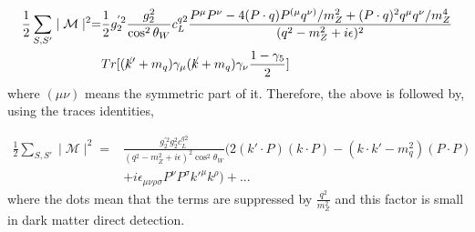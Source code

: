 \documentclass[12pt]{article}
\begin{document}
\begin{equation}
\begin{aligned}
\frac{1}{2}\sum_{S,S'} \mid \mathcal M \mid ^2 = 
&
\frac{1}{2} g_2 ^{'2} \frac{g_2^2}{\cos^2 \theta_W} c^{q2}_L \frac{P^\mu P^\nu - 4(P \cdot q ) P^{(\mu} q^{\nu)} / m_Z^2 + (P \cdot q )^2 q^\mu q^\nu / m_Z^4 }{(q^2-m_Z^2 +i\epsilon)^2} \\
 &  Tr[(\cancel k'+m_q)  \gamma_\mu (\cancel k+m_q) \gamma_\nu \frac{1-\gamma_5}{2}]
\end{aligned}
\end{equation}
where $(\mu \nu)$ means the symmetric part of it. Therefore, the above is followed by, using the traces identities, 

\begin{equation}
\begin{aligned}
\frac{1}{2}\sum_{S,S'} \mid \mathcal M \mid ^2 = 
&
 \frac{ g_2 ^{'2} g_2 ^2  c_L^{q2}}{(q^2-m_Z^2 +i\epsilon)^2\cos^2 \theta_W} 
  (2(k' \cdot P)(k \cdot P)-( k \cdot k' - m_q^2)(P \cdot P )\\
 &
 + i  \epsilon_{\mu\nu\rho\sigma} P^\nu P^\sigma k'^\mu k^\rho ) + ...
\end{aligned}
\end{equation}
where the dots mean that the terms are suppressed by $\frac{q^2}{m_Z^2}$ and this factor is small in dark matter direct detection. 
\end{document}
